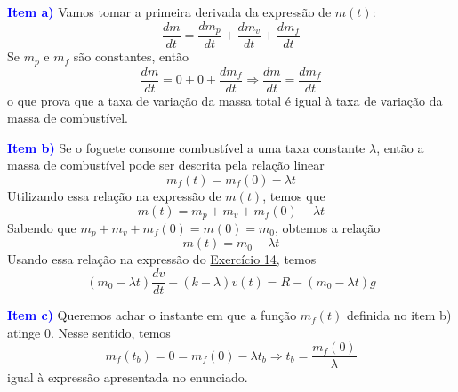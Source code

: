 \documentclass[oneside,12pt,a4paper]{report}
\begin{document}
        \begin{tcolorbox}[enhanced, breakable, colback=blue!1!white,colframe=blue!75!black,title=\textbf{\hyperlink{quest:ex14}{\hypertarget{resp:ex14}{Exercício 14}}}]
            \noindent\textcolor{blue}{\textbf{Item a)}} Vamos tomar a primeira derivada da expressão de $m(t)$:
            \[\frac{dm}{dt}=\frac{dm_p}{dt}+\frac{dm_v}{dt}+\frac{dm_f}{dt}\]
            \noindent Se $m_p$ e $m_f$ são constantes, então
            \[\frac{dm}{dt}=0+0+\frac{dm_f}{dt}\Rightarrow\boxed{\frac{dm}{dt}=\frac{dm_f}{dt}}\]
            \noindent o que prova que a taxa de variação da massa total é igual à taxa de variação da massa de combustível.

            \noindent\textcolor{blue}{\textbf{Item b)}} Se o foguete consome combustível a uma taxa constante $\lambda$, então a massa de combustível pode ser descrita pela relação linear
            \[m_f(t)=m_f(0)-\lambda t\]
            Utilizando essa relação na expressão de $m(t)$, temos que
            \[m(t)=m_p+m_v+m_f(0)-\lambda t\]
            Sabendo que $m_p+m_v+m_f(0)=m(0)=m_0$, obtemos a relação
            \[m(t)=m_0-\lambda t\]
            Usando essa relação na expressão do \hyperlink{resp:ex14}{Exercício 14}, temos
            \[\boxed{(m_0-\lambda t)\frac{dv}{dt}+(k-\lambda)v(t)=R-(m_0-\lambda t)g}\]

            \noindent\textcolor{blue}{\textbf{Item c)}} Queremos achar o instante em que a função $m_f(t)$ definida no item b) atinge $0$. Nesse sentido, temos
            \[m_f(t_b)=0=m_f(0)-\lambda t_b\Rightarrow\boxed{t_b=\frac{m_f(0)}{\lambda}}\]
            \noindent igual à expressão apresentada no enunciado.
        \end{tcolorbox}
\end{document}
